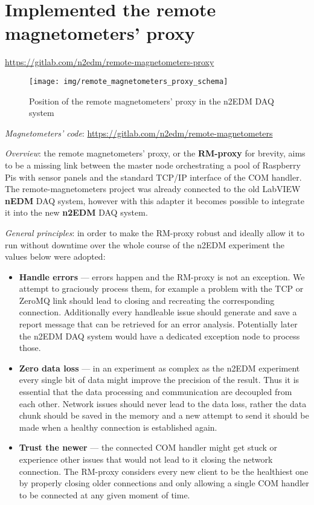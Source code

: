 \section{Implemented the remote magnetometers' proxy}
\label{sec:rm-proxy}

\url{https://gitlab.com/n2edm/remote-magnetometers-proxy}

\begin{figure}[h]
	\texttt{[image: img/remote\_magnetometers\_proxy\_schema]}
	\caption{Position of the remote magnetometers' proxy in the n2EDM DAQ system}
	\label{fig:rm-proxy_position}
\end{figure}

\textit{Magnetometers' code}: \url{https://gitlab.com/n2edm/remote-magnetometers}

\textit{Overview}: the remote magnetometers' proxy, or the \textbf{RM-proxy} for brevity, aims to be a missing link between the master node orchestrating a pool of Raspberry Pis with sensor panels and the standard TCP/IP interface of the COM handler. The remote-magnetometers project was already connected to the old LabVIEW \textbf{nEDM} DAQ system, however with this adapter it becomes possible to integrate it into the new \textbf{n2EDM} DAQ system.

\textit{General principles}: in order to make the RM-proxy robust and ideally allow it to run without downtime over the whole course of the n2EDM experiment the values below were adopted:

\begin{itemize}
	\item \textbf{Handle errors} --- errors happen and the RM-proxy is not an exception. We attempt to graciously process them, for example a problem with the TCP or ZeroMQ link should lead to closing and recreating the corresponding connection. Additionally every handleable issue should generate and save a report message that can be retrieved for an error analysis. Potentially later the n2EDM DAQ system would have a dedicated exception node to process those.
	\item \textbf{Zero data loss} --- in an experiment as complex as the n2EDM experiment every single bit of data might improve the precision of the result. Thus it is essential that the data processing and communication are decoupled from each other. Network issues should never lead to the data loss, rather the data chunk should be saved in the memory and a new attempt to send it should be made when a healthy connection is established again.
	\item \textbf{Trust the newer} --- the connected COM handler might get stuck or experience other issues that would not lead to it closing the network connection. The RM-proxy considers every new client to be the healthiest one by properly closing older connections and only allowing a single COM handler to be connected at any given moment of time.
\end{itemize}

